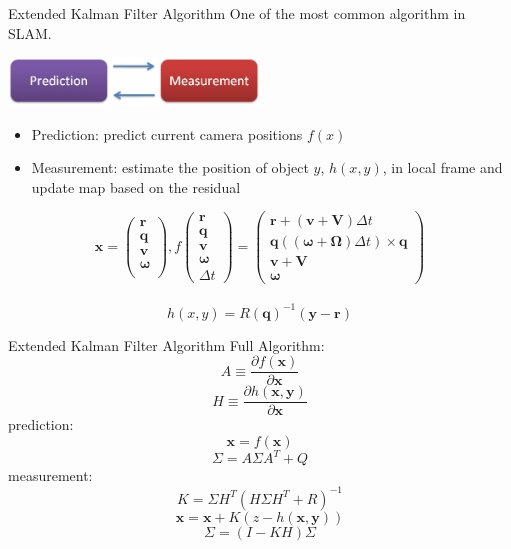 \documentclass{beamer}
\begin{document}
	\begin{frame}{Extended Kalman Filter Algorithm}
		One of the most common algorithm in SLAM.\\
		\uncover<2->
		{
			\begin{center}
				\includegraphics[width=0.5\textwidth]{./pics/ekf.jpg} 
			\end{center}
			\begin{itemize}
				\item Prediction: predict current camera positions \alert{$f(x)$}
				\item Measurement: estimate the position of object $y$, \alert{$h(x,y)$}, in local frame and update map based on the residual
			\end{itemize}
		}
		{
			\[
			\mathbf{x} = \left( 
			\begin{array}{c} 
				\mathbf{r}\\
				\mathbf{q}\\
				\mathbf{v}\\
				\mathbf{\omega}\\
			\end{array}
			\right),  
			f\left( 
			\begin{array}{c} 
				\mathbf{r}\\
				\mathbf{q}\\
				\mathbf{v}\\
				\mathbf{\omega}\\
				\Delta t
			\end{array} 
			\right) = 
			\left( 
			\begin{array}{c}
				\mathbf{r} + (\mathbf{v}+\mathbf{V})\Delta t\\
				\mathbf{q}((\mathbf{\omega}+\mathbf{\Omega})\Delta t) \times \mathbf{q}\\
				\mathbf{v} + \mathbf{V}\\
				\mathbf{\omega} 
			\end{array} 
			\right)
			\] \\

			\[ h(x,y) = R(\mathbf{q})^{-1}( \mathbf{y}-\mathbf{r} ) \]
		}
	\end{frame}

	\begin{frame}{Extended Kalman Filter Algorithm}
		Full Algorithm: \\
		\[ A \equiv \frac{ \partial f(\mathbf{x}) }{ \partial \mathbf{x} } \]
		\[ H \equiv \frac{ \partial h(\mathbf{x},\mathbf{y}) }{ \partial \mathbf{x} } \]
		prediction:\\
		\[\mathbf{x} = f(\mathbf{x})\]
		\[\Sigma = A\Sigma A^{T} + Q\]
		measurement:\\
		\[K = \Sigma H^{T}(H\Sigma H^{T}+R)^{-1}\]
		\[\mathbf{x} = \mathbf{x}+K(z-h(\mathbf{x},\mathbf{y}))\]
		\[\Sigma = (I-KH)\Sigma\]


	\end{frame}
\end{document}
